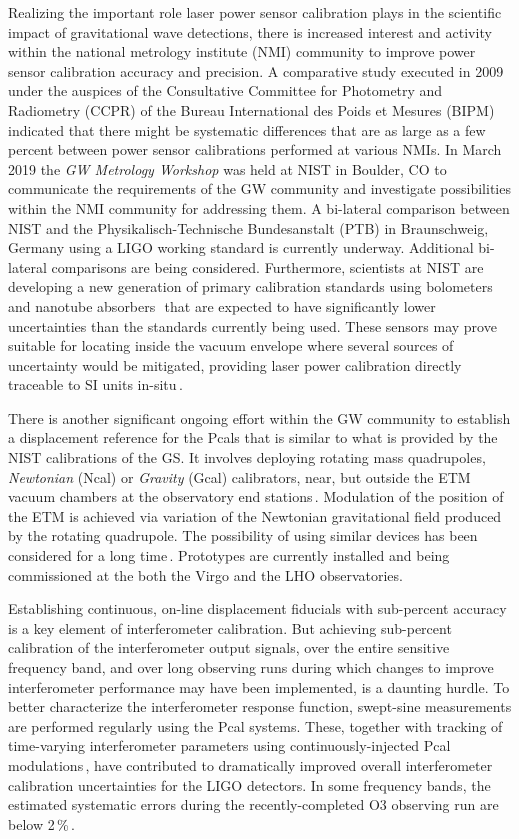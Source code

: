 \documentclass[12pt,a4paper,final]{iopart}
\begin{document}
Realizing the important role laser power sensor calibration plays in the scientific impact of gravitational wave detections, there is increased interest and activity within the national metrology institute (NMI) community to improve power sensor calibration accuracy and precision.   A comparative study executed in 2009 under the auspices of the Consultative Committee for Photometry and Radiometry (CCPR) of the Bureau International des Poids et Mesures (BIPM)\,\cite{Euromet} indicated that there might be systematic differences that are as large as a few percent between power sensor calibrations performed at various NMIs.  In March 2019 the {\em GW Metrology Workshop} was held at NIST in Boulder, CO to communicate the requirements of the GW community and investigate possibilities within the NMI community for addressing them.  A bi-lateral comparison between NIST and the Physikalisch-Technische Bundesanstalt (PTB) in Braunschweig, Germany using a LIGO working standard is currently underway. Additional bi-lateral comparisons are being considered.  Furthermore, scientists at NIST are developing a new generation of primary calibration standards using bolometers and nanotube absorbers\,\,\cite{SPIE} that are expected to have significantly lower uncertainties than the standards currently being used.  These sensors may prove suitable for locating inside the vacuum envelope where several sources of uncertainty would be mitigated, providing laser power calibration directly traceable to SI units in-situ\,\cite{lehmanNIST}.

There is another significant ongoing effort within the GW community to establish a displacement reference for the Pcals that is similar to what is provided by the NIST calibrations of the GS.  It involves deploying rotating mass quadrupoles, {\em Newtonian} (Ncal) or {\em Gravity} (Gcal) calibrators, near, but outside the ETM vacuum chambers at the observatory end stations\,\cite{InoueGcal,EstevezNcal}.  Modulation of the position of the ETM is achieved via variation of the Newtonian gravitational field produced by the rotating quadrupole.  The possibility of using similar devices has been considered for a long time\,\cite{MatoneGcal}.  Prototypes are currently installed and being commissioned at the both the Virgo and the LHO observatories.

Establishing continuous, on-line displacement fiducials with sub-percent accuracy is a key element of interferometer calibration.  But achieving sub-percent calibration of the interferometer output signals, over the entire sensitive frequency band, and over long observing runs during which changes to improve interferometer performance may have been implemented, is a daunting hurdle.  To better characterize the interferometer response function, swept-sine measurements are performed regularly using the Pcal systems.  These, together with tracking of time-varying interferometer parameters using continuously-injected Pcal modulations\,\cite{DarkhanTDPs}, have contributed to dramatically improved overall interferometer calibration uncertainties for the LIGO detectors.  In some frequency bands, the estimated systematic errors during the recently-completed O3 observing run are below 2\,\%\,\cite{LilliO3systematic}. 
\end{document}
